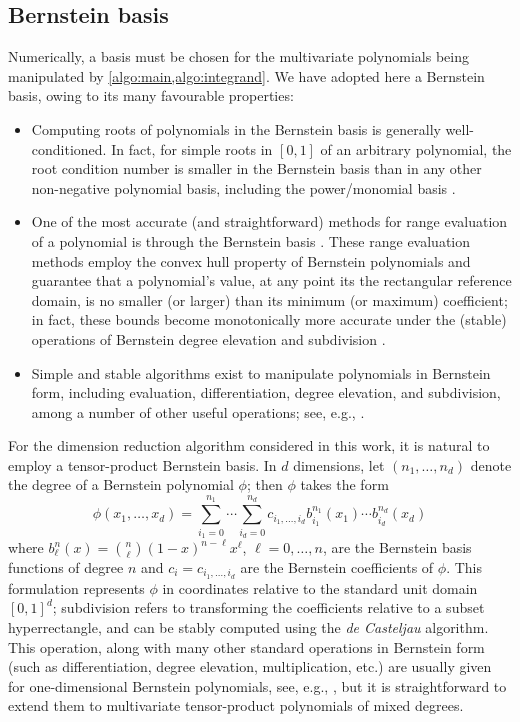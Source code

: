 \documentclass[onefignum,onetabnum,onealgnum,oneeqnum]{siamart190516}
\begin{document}
\subsection{Bernstein basis}
\label{sec:bernstein}

Numerically, a basis must be chosen for the multivariate polynomials being manipulated by \cref{algo:main,algo:integrand}. We have adopted here a Bernstein basis, owing to its many favourable properties:
\begin{itemize}
\item Computing roots of polynomials in the Bernstein basis is generally well-conditioned. In fact, for simple roots in $[0,1]$ of an arbitrary polynomial, the root condition number is smaller in the Bernstein basis than in any other non-negative polynomial basis, including the power/monomial basis \cite{10.1090/S0025-5718-96-00759-4,FAROUKI19881}. %
\item One of the most accurate (and straightforward) methods for range evaluation of a polynomial is through the Bernstein basis \cite{garloff1993bernstein,Rajyaguru2017,garloff1993bernstein,lin1995methods,beska1989convexity}. These range evaluation methods employ the convex hull property of Bernstein polynomials and guarantee that a polynomial's value, at any point its the rectangular reference domain, is no smaller (or larger) than its minimum (or maximum) coefficient; in fact, these bounds become monotonically more accurate under the (stable) operations of Bernstein degree elevation and subdivision \cite{garloff1993bernstein,lin1995methods}.
\item Simple and stable algorithms exist to manipulate polynomials in Bernstein form, including evaluation, differentiation, degree elevation, and subdivision, among a number of other useful operations; see, e.g., \cite{FAROUKI19881}.
\end{itemize}
For the dimension reduction algorithm considered in this work, it is natural to employ a tensor-product Bernstein basis. In $d$ dimensions, let $(n_1,\ldots,n_d)$ denote the degree of a Bernstein polynomial $\phi$; then $\phi$ takes the form
\begin{equation} \label{eq:tensorprod} \phi(x_1,\ldots,x_d) = \sum_{i_1 = 0}^{n_1} \cdots \sum_{i_d = 0}^{n_d} c_{i_1,\ldots,i_d} b_{i_1}^{n_1} (x_1) \cdots  b_{i_d}^{n_d} (x_d) \end{equation}
where $b_\ell^n(x) = \binom{n}{\ell} (1 - x)^{n-\ell} x^\ell$, $\ell = 0, \ldots, n$, are the Bernstein basis functions of degree $n$ and $c_i = c_{i_1,\ldots,i_d}$ are the Bernstein coefficients of $\phi$. This formulation represents $\phi$ in coordinates relative to the standard unit domain $[0,1]^d$; subdivision refers to transforming the coefficients relative to a subset hyperrectangle, and can be stably computed using the \textit{de Casteljau} algorithm. This operation, along with many other standard operations in Bernstein form (such as differentiation, degree elevation, multiplication, etc.) are usually given for one-dimensional Bernstein polynomials, see, e.g., \cite{FAROUKI19881}, but it is straightforward to extend them to multivariate tensor-product polynomials of mixed degrees. %
\end{document}
